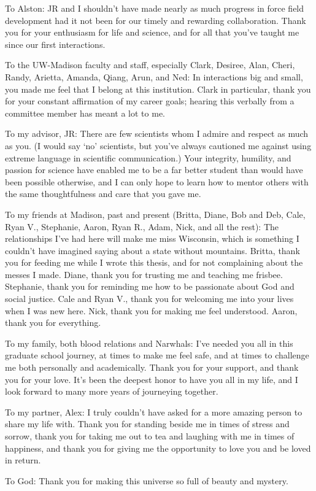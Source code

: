 To Alston: JR and I shouldn't have made nearly as much progress in
force field development had it not been for our timely and rewarding
collaboration. Thank you for your enthusiasm for life and science, and for all
that you've taught me since our first interactions.

To the UW-Madison faculty and staff, especially Clark, Desiree, Alan, Cheri, Randy,
Arietta, Amanda, Qiang, Arun, and Ned: In interactions big and small, you made me feel
that I belong at this institution. Clark in particular, thank you for
your constant affirmation of my career goals; hearing this verbally from a
committee member has meant a lot to me.

To my advisor, JR: There are few scientists whom I admire and respect as much
as you. (I would say `no' scientists, but you've always cautioned me
against using extreme language in scientific communication.) Your integrity,
humility, and passion for science have enabled me to be a far better student
than would have been possible otherwise, and I can only hope to learn how to
mentor others with the same thoughtfulness and care that you gave me.

To my friends at Madison, past and present (Britta, Diane, Bob and Deb, Cale, Ryan V.,
Stephanie, Aaron, Ryan R., Adam, Nick, and all the rest): The relationships
I've had here will make me miss Wisconsin, which is something I couldn't have
imagined saying about a state without mountains. Britta, thank you for feeding
me while I wrote this thesis, and for not complaining about the messes I made.
Diane, thank you for trusting me and teaching me frisbee. Stephanie, thank you
for reminding me how to be passionate about God and social justice.  Cale and
Ryan V., thank you for welcoming me into your lives when I was new here.
Nick, thank you for making me feel understood.  Aaron, thank you for
everything.

To my family, both blood relations and Narwhals: I've needed you all in this
graduate school journey, at times to make me feel safe, and at times to
challenge me both personally and academically. Thank you for your support, and
thank you for your love. It's been the deepest honor to have you all in my
life, and I look forward to many more years of journeying together.

To my partner, Alex: I truly couldn't have asked for a more amazing person to share my
life with. Thank you for standing beside me in times of stress and sorrow,
thank you for taking me out to tea and laughing with me in times of happiness,
and thank you for giving me the opportunity to love you and be loved in return.

To God: Thank you for making this universe so full of beauty and mystery.


